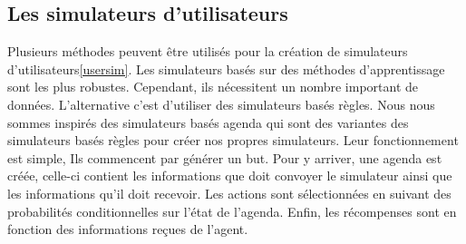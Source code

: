 	\subsection{Les simulateurs d'utilisateurs}
	Plusieurs méthodes peuvent être utilisés pour la création de simulateurs d’utilisateurs\ref{usersim}. Les simulateurs basés sur des méthodes d’apprentissage sont les plus robustes. Cependant, ils nécessitent un nombre important de données. L’alternative c’est d’utiliser des simulateurs basés règles. Nous nous sommes inspirés des simulateurs basés agenda\cite{Schatzmann2007} qui sont des variantes des simulateurs basés règles pour créer nos propres simulateurs. Leur fonctionnement est simple, Ils commencent par générer un but. Pour y arriver, une agenda est créée, celle-ci contient les informations que doit convoyer le simulateur ainsi que les informations qu’il doit recevoir. Les actions sont sélectionnées en suivant des probabilités conditionnelles sur l’état de l’agenda. Enfin, les récompenses sont en fonction des informations reçues de l’agent.
